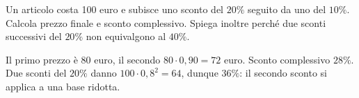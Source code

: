 
\begin{esercizio}
Un articolo costa 100 euro e subisce uno sconto del $20\%$ seguito da uno del $10\%$. Calcola prezzo finale e sconto complessivo. Spiega inoltre perché due sconti successivi del $20\%$ non equivalgono al $40\%$.
\end{esercizio}

\begin{soluzione}
Il primo prezzo è 80 euro, il secondo $80\cdot0{,}90=72$ euro. Sconto complessivo $28\%$. Due sconti del $20\%$ danno $100\cdot0{,}8^2=64$, dunque $36\%$: il secondo sconto si applica a una base ridotta.
\end{soluzione}
